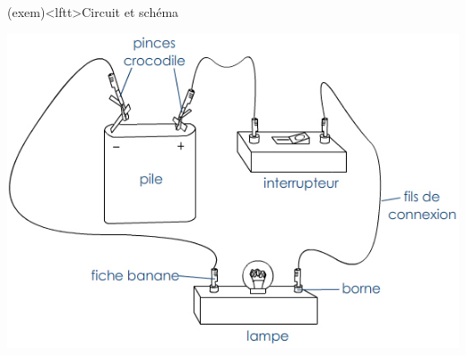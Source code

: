 \documentclass[../../main/main.tex]{subfiles}
\begin{document}
\begin{tcb}[label=exem:circuits, sidebyside](exem)<lftt>{Circuit et schéma}
	\begin{center}
		\includegraphics[width=.7\linewidth]{circuit_simple_dessin.jpg}
	\end{center}
	\tcblower
	\begin{center}
	\end{center}
\end{tcb}
\end{document}
